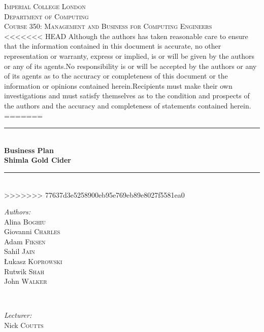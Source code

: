 \documentclass[11pt]{article}
\begin{document}

\begin{titlepage}
\newcommand{\HRule}{\rule{\linewidth}{0.5mm}}
\center
\textsc{\LARGE Imperial College London}  \\[1.5cm]
\textsc{\Large Department of Computing}  \\[0.5cm]
\textsc{\large Course 350: Management and Business for Computing Engineers} \\[0.5cm]

<<<<<<< HEAD
\noindent Although the authors has taken reasonable care to ensure that the information contained in this
document is accurate, no other representation or warranty, express or implied, is or will be
given by the authors or any of its agents.No responsibility is or will be accepted by the authors or any of its
agents as to the accuracy or completeness of this document or the information or opinions
contained herein.Recipients must make their own investigations and must satisfy themselves
as to the condition and prospects of the authors and the accuracy and completeness of statements
contained herein. \\
=======
\HRule \\[0.3cm]
{\huge \bfseries Business Plan \\ \vspace{0.3cm}Shimla Gold Cider} \\[0.3cm]
\HRule \\[1.5cm]
>>>>>>> 77637d3e5258900eb95e769eb89e8027f5581ea0

\begin{minipage}{0.4\textwidth}

\begin{flushleft} \large \emph{Authors:} \\
Alina     \textsc{Boghiu}    \\
Giovanni  \textsc{Charles}   \\
Adam      \textsc{Fiksen}    \\
Sahil     \textsc{Jain}      \\
\L ukasz  \textsc{Koprowski} \\
Rutwik    \textsc{Shah}      \\
John      \textsc{Walker}    \\
\end{flushleft}

\end{minipage}~
\begin{minipage}{0.4\textwidth}

\begin{flushright} \large \emph{Lecturer:} \\
Nick \textsc{Coutts}
\end{flushright}
\end{minipage}\\[4cm]

\end{titlepage}
\end{document}

